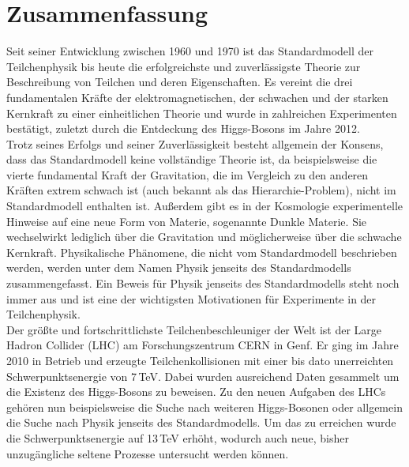 \chapter*{Zusammenfassung}
Seit seiner Entwicklung zwischen 1960 und 1970 ist das Standardmodell der Teilchenphysik bis heute die erfolgreichste und zuverlässigste Theorie zur Beschreibung von Teilchen und deren Eigenschaften. Es vereint die drei fundamentalen Kräfte der elektromagnetischen, der schwachen und der starken Kernkraft zu einer einheitlichen Theorie und wurde in zahlreichen Experimenten bestätigt, zuletzt durch die Entdeckung des Higgs-Bosons im Jahre 2012.\\

Trotz seines Erfolgs und seiner Zuverlässigkeit besteht allgemein der Konsens, dass das Standardmodell keine vollständige Theorie ist, da beispielsweise die vierte fundamental Kraft der Gravitation, die im Vergleich zu den anderen Kräften extrem schwach ist (auch bekannt als das Hierarchie-Problem), nicht im Standardmodell enthalten ist. Außerdem gibt es in der Kosmologie experimentelle Hinweise auf eine neue Form von Materie, sogenannte Dunkle Materie. Sie wechselwirkt lediglich über die Gravitation und möglicherweise über die schwache Kernkraft. Physikalische Phänomene, die nicht vom Standardmodell beschrieben werden, werden unter dem Namen Physik jenseits des Standardmodells zusammengefasst. Ein Beweis für Physik jenseits des Standardmodells steht noch immer aus und ist eine der wichtigsten Motivationen für Experimente in der Teilchenphysik.\\

Der größte und fortschrittlichste Teilchenbeschleuniger der Welt ist der Large Hadron Collider (LHC) am Forschungszentrum CERN in Genf. Er ging im Jahre 2010 in Betrieb und erzeugte Teilchenkollisionen mit einer bis dato unerreichten Schwerpunktsenergie von 7\,TeV. Dabei wurden ausreichend Daten gesammelt um die Existenz des Higgs-Bosons zu beweisen. Zu den neuen Aufgaben des LHCs gehören nun beispielsweise die Suche nach weiteren Higgs-Bosonen oder allgemein die Suche nach Physik jenseits des Standardmodells. Um das zu erreichen wurde die Schwerpunktsenergie auf 13\,TeV erhöht, wodurch auch neue, bisher unzugängliche seltene Prozesse untersucht werden können.\\


